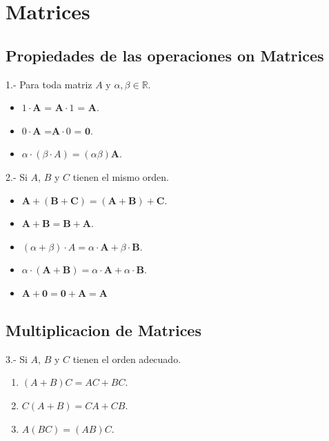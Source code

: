 \documentclass[
]{article}
\providecommand{\tightlist}{%
  \setlength{\itemsep}{0pt}\setlength{\parskip}{0pt}}
\begin{document}
\hypertarget{matrices-1}{%
\section{Matrices}\label{matrices-1}}

\hypertarget{propiedades-de-las-operaciones-on-matrices}{%
\subsection{Propiedades de las operaciones on
Matrices}\label{propiedades-de-las-operaciones-on-matrices}}

\small

1.- Para toda matriz \(A\) y \(\alpha,\beta\in \mathbb{R}\).

\begin{itemize}
\item
  \(1 \cdot \textbf{A}\) = \(\textbf{A} \cdot 1\) = \(\textbf{A}\).
\item
  \(0\cdot \mathbf{A}\) =\(\mathbf{A}\cdot 0\) = \(\mathbf{0}\).
\item
  \(\alpha \cdot (\beta\cdot A) = (\alpha \beta)\mathbf{A}\).
\end{itemize}

2.- Si \(A\), \(B\) y \(C\) tienen el mismo orden.

\begin{itemize}
\tightlist
\item
  \(\mathbf{A} + (\mathbf{B} + \mathbf{C}) = (\mathbf{A} + \mathbf{B}) + \mathbf{C}\).
\item
  \(\mathbf{A} + \mathbf{B} = \mathbf{B} + \mathbf{A}\).
\item
  \((\alpha+\beta)\cdot A = \alpha\cdot \mathbf{A} + \beta \cdot \mathbf{B}\).
\item
  \(\alpha \cdot (\mathbf{A}+ \mathbf{B}) = \alpha\cdot \mathbf{A} + \alpha \cdot \mathbf{B}\).
\item
  \(\mathbf{A}+\mathbf{0} = \mathbf{0}+\mathbf{A}=\mathbf{A}\)
\end{itemize}

\hypertarget{multiplicacion-de-matrices}{%
\subsection{Multiplicacion de
Matrices}\label{multiplicacion-de-matrices}}

\small

3.- Si \(A\), \(B\) y \(C\) tienen el orden adecuado.

\begin{enumerate}
\def\labelenumi{\alph{enumi})}
\tightlist
\item
  \((A+B)C = AC + BC\).
\item
  \(C(A+B) = CA + CB\).
\item
  \(A(BC) = (AB)C\).
\end{enumerate}
\end{document}
